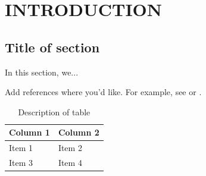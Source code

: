 \chapter{INTRODUCTION} %

\section{Title of section}
In this section, we...  

Add references where you'd like. For example, see \cite{Bredberg} or \cite{Bui}.

\lipsum[1-2]

\begin{table}[ht]
    \centering
    \begin{tabular}{ll}
        \hline
        Column 1 & Column 2 \\
        \hline
        Item 1 & Item 2 \\
        Item 3 & Item 4 \\
        \hline
    \end{tabular}
    \caption{Description of table}
\end{table}